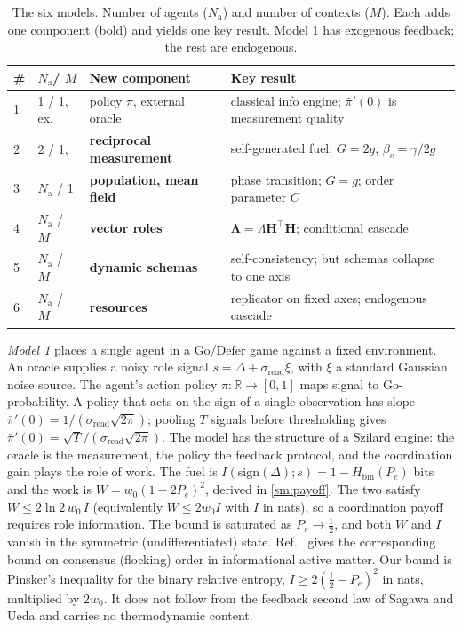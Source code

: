 \documentclass[
  aps,prx,
  preprint,
  superscriptaddress,
  nofootinbib
]{revtex4-2}
\newcommand{\Lam}{\bm{\Lambda}}
\newcommand{\sread}{\sigma_{\mathrm{read}}}
\newcommand{\pibar}{\bar\pi}
\newcommand{\gain}{g}
\newcommand{\Nag}{N_{\mathrm{a}}}
\begin{document}
\begin{table}[h]
\centering
\caption{The six models. Number of agents ($\Nag$) and number of contexts ($M$). Each adds one component (bold) and yields one key result. Model 1 has exogenous feedback; the rest are endogenous.}
\label{tab:ladder}
\begin{tabular}{@{}llll@{}}
\toprule
\# &  $\Nag$/ $M$ & New component & Key result \\
\midrule
1 & 1 / 1, ex. & policy $\pi$, external oracle & classical info engine; $\pibar'(0)$ is measurement quality \\
2 & 2 / 1,  & \textbf{reciprocal measurement} & self-generated fuel; $G=2\gain$, $\beta_c=\gamma/2\gain$ \\
3 & $\Nag$ / 1 & \textbf{population, mean field} & phase transition; $G=\gain$; order parameter $C$ \\
4 & $\Nag$ / $M$ & \textbf{vector roles} & $\Lam=\Lambda\bm{H}^{\!\top}\!\bm{H}$; conditional cascade \\
5 & $\Nag$ / $M$ & \textbf{dynamic schemas} & self-consistency; but schemas collapse to one axis \\
6 & $\Nag$ / $M$ & \textbf{resources} & replicator on fixed axes; endogenous cascade \\
\bottomrule
\end{tabular}
\end{table}

\emph{Model 1} places a single agent in a Go/Defer game against a fixed environment. An oracle supplies a noisy role signal $s=\Delta+\sread\xi$, with $\xi$ a standard Gaussian noise source. The agent's action policy $\pi:\mathbb{R}\to[0,1]$ maps signal to Go-probability. A policy that acts on the sign of a single observation has slope $\pibar'(0)=1/(\sread\sqrt{2\pi})$; pooling $T$ signals before thresholding gives $\pibar'(0)=\sqrt{T}/(\sread\sqrt{2\pi})$. The model has the structure of a Szilard engine: the oracle is the measurement, the policy the feedback protocol, and the coordination gain plays the role of work. The fuel is $I(\mathrm{sign}(\Delta);s)=1-H_{\mathrm{bin}}(P_e)$ bits and the work is $W=w_0(1-2P_e)^2$, derived in \cref{sm:payoff}. The two satisfy $W\le 2\ln2\,w_0\,I$ (equivalently $W\le 2w_0I$ with $I$ in nats), so a coordination payoff requires role information. The bound is saturated as $P_e\to\tfrac12$, and both $W$ and $I$ vanish in the symmetric (undifferentiated) state. Ref.~\cite{vansaders2023} gives the corresponding bound on consensus (flocking) order in informational active matter. Our bound is Pinsker's inequality for the binary relative entropy, $I\ge2(\tfrac12-P_e)^2$ in nats, multiplied by $2w_0$. It does not follow from the feedback second law of Sagawa and Ueda \cite{sagawa2010} and carries no thermodynamic content.
\end{document}
